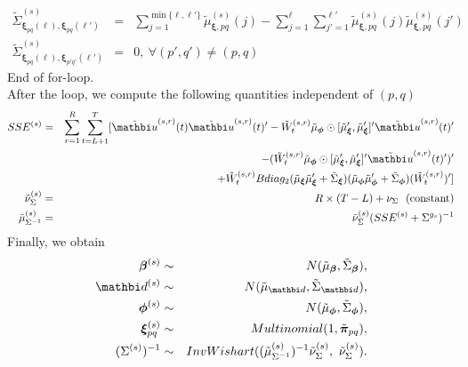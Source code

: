 \documentclass[12pt,titlepage,fleqn]{article}
\newcommand{\1}{{\bm 1}}
\newcommand{\vu}{\mathbi u}
\newcommand{\vd}{\mathbi d}
\newcommand{\vbeta}{\boldsymbol \beta}
\newcommand{\vphi}{\boldsymbol \phi}
\newcommand{\vxi}{\boldsymbol \xi}
\newcommand{\vpi}{\boldsymbol{\pi}}
\newcommand{\gs}{^{g_s}}
\newcommand{\s}{^{(s)}}
\newcommand{\sr}{^{(s,r)}}
\begin{document}
{\begin{eqnarray*}
\tilde{\Sigma}_{\vxi_{pq}(\ell), \vxi_{pq}(\ell')}\s &=& \sum_{j=1}^{\min\{\ell,\ell'\}}\tilde{\mu}_{\vxi, pq}\s(j) - \sum_{j=1}^{\ell}\sum_{j'=1}^{\ell'}\tilde{\mu}_{\vxi,pq}\s(j)\tilde{\mu}_{\vxi,pq}\s(j')\\ 
\tilde{\Sigma}_{\vxi_{pq}(\ell),\vxi_{p'q'}(\ell')}\s &=& 0, ~\forall (p',q')\ne(p,q)
\end{eqnarray*}
End of for-loop.\\
After the loop, we compute the following quantities independent of $(p,q)$
\begin{eqnarray*}
SSE\s &=& \sum_{r=1}^{R}\sum_{t=L+1}^{T}[\tilde{\vu}\sr(t)\tilde{\vu}\sr(t)' - \tilde{W}_t\sr\tilde{\mu}_{\vphi}\odot [\tilde{\mu}_{\vxi}', \tilde{\mu}_{\vxi}']'\tilde{\vu}\sr(t)' \\
&&- (\tilde{W}_t\sr\tilde{\mu}_{\vphi}\odot [\tilde{\mu}_{\vxi}', \tilde{\mu}_{\vxi}']'\tilde{\vu}\sr(t)')'\\
&& + \tilde{W}_t\sr Bdiag_2(\tilde{\mu}_{\vxi}\tilde{\mu}_{\vxi}'+\tilde{\Sigma}_{\vxi})(\tilde{\mu}_{\vphi}\tilde{\mu}_{\vphi}'+\tilde{\Sigma}_{\vphi})(\tilde{W}_t\sr)']\\ 
\tilde{\nu}_{\Sigma}\s&=& R\times(T - L) +\nu_{\Sigma} ~~\text{(constant)}\\
\tilde{\mu}_{\Sigma^{-1}}\s&=& \tilde{\nu}_{\Sigma}\s(SSE\s + \Sigma\gs)^{-1}
\end{eqnarray*}
Finally, we obtain 
\begin{eqnarray*}
\vbeta\s &\sim& N(\tilde{\mu}_{\vbeta}, \tilde{\Sigma}_{\vbeta}), \\
\vd\s &\sim& N(\tilde{\mu}_{\vd}, \tilde{\Sigma}_{\vd}), \\
\vphi\s &\sim& N(\tilde{\mu}_{\vphi}, \tilde{\Sigma}_{\vphi}), \\
\vxi_{pq}\s& \sim & Multinomial(1, \tilde{\vpi}_{pq}),\\
(\Sigma\s)^{-1} &\sim & InvWishart((\tilde{\mu}_{\Sigma^{-1}}\s)^{-1}\tilde{\nu}_{\Sigma}\s, ~ \tilde{\nu}_{\Sigma}\s).
\end{eqnarray*}
}





\end{document}
